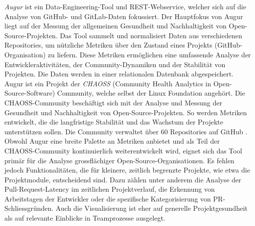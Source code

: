 \textit{Augur} ist ein Data-Engineering-Tool und REST-Webservice, welcher sich auf die Analyse von GitHub- und GitLab-Daten fokussiert. Der Hauptfokus von Augur liegt auf der Messung der allgemeinen Gesundheit und Nachhaltigkeit von Open-Source-Projekten. Das Tool sammelt und normalisiert Daten aus verschiedenen Repositories, um nützliche Metriken über den Zustand eines Projekts (GitHub-Organi\-sation) zu liefern. Diese Metriken ermöglichen eine umfassende Analyse der Entwickleraktivitäten, der Community-Dynamiken und der Stabilität von Projekten. Die Daten werden in einer relationalen Datenbank abgespeichert. Augur ist ein Projekt der \textit{CHAOSS} (Community Health Analytics in Open-Source-Software) Community, welche selbst der Linux Foundation angehört. Die CHAOSS-Community beschäftigt sich mit der Analyse und Messung der Gesundheit und Nachhaltigkeit von Open-Source-Projekten. So werden Metriken entwickelt, die die langfristige Stabilität und das Wachstum der Projekte unterstützen sollen. Die Community verwaltet über 60 Repositories auf GitHub \parencite{noauthor_chaoss_nodate}.
Obwohl Augur eine breite Palette an Metriken anbietet und als Teil der CHAOSS-Community kontinuierlich weiterentwickelt wird, eignet sich das Tool primär für die Analyse grossflächiger Open-Source-Organisationen. Es fehlen jedoch Funktionalitäten, die für kleinere, zeitlich begrenzte Projekte, wie etwa die Projektmodule, entscheidend sind. Dazu zählen unter anderem die Analyse der Pull-Request-Latency im zeitlichen Projektverlauf, die Erkennung von Arbeitstagen der Entwickler oder die spezifische Kategorisierung von PR-Schliessgründen. Auch die Visualisierung ist eher auf generelle Projektgesundheit als auf relevante Einblicke in Teamprozesse ausgelegt. \parencite{noauthor_about_nodate-1} \parencite{noauthor_chaossaugur_nodate}



